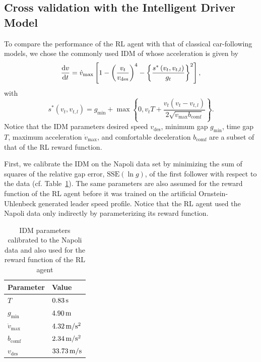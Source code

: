 \documentclass[review]{elsarticle}
\providecommand{\sub}[1]{_{\mathrm{#1}}}  %
\providecommand{\3}{{\ss}}
\begin{document}
	
	\subsection{Cross validation with the Intelligent Driver Model}
	\label{sec:crossValIDM}
	To compare the performance of the RL agent with that of
	classical car-following models, we chose the commonly used
	IDM of \cite{Opus} whose acceleration is given
	by 
	\begin{equation}
		\label{eq:IDM}
		\dv{v}{t}=\dot{v}\sub{max}\left[1-\left(\frac{v_t}{v\sub{des}}\right)^{4}-\left\{\frac{s^{*}\left(v_t, v_{t,l}\right)}{g_t}\right\}^{2}\right],
	\end{equation}
	with
	\begin{equation}
		\label{eq:IDMsstar}
		s^{*}\left(v_t, v_{t,l}\right)=g\sub{min}+\max \left\{0,v_tT+\frac{v_t(v_t-v_{t,l})}{2 \sqrt{\dot{v}\sub{max} b\sub{comf}}}\right\}.
	\end{equation}
	Notice that the IDM parameters desired
	speed $v\sub{des}$, minimum gap $g\sub{min}$, time gap $T$, maximum
	acceleration $\dot{v}\sub{max}$, and
	comfortable deceleration $b\sub{comf}$ are a subset of that of the RL reward
	function. 
	
	First, we calibrate the IDM on the Napoli data set by
	minimizing the sum of squares of the relative gap error,
	$\mathrm{SSE}(\ln g)$, of the first follower with respect to the
	data (cf. Table~\ref{tab:IDMparameters}). The same parameters are also
	assumed for the reward function of the RL agent before it was trained
	on the artificial Ornstein-Uhlenbeck generated leader speed profile. Notice that the RL agent used the Napoli data only
	indirectly by parameterizing its reward function.
	
	\begin{table}
		\caption{IDM parameters calibrated to the Napoli
			data and also used for the reward function of the RL agent}
		\label{tab:IDMparameters} 
		\begin{center}
			\begin{tabular}{ p{} |p{}  } 
				Parameter & Value   \\ \hline
				$T$ & $\unit[0.83]{s}$\\
				$g\sub{min}$ & $\unit[4.90]{m}$\\
				$\dot{v}\sub{max}$ & $\unit[4.32]{m/s^2}$\\
				$b\sub{comf}$ & $\unit[2.34]{ m/s^2}$\\
				$v\sub{des}$ & $\unit[33.73]{m/s}$			
			\end{tabular}
		\end{center}
	\end{table}
	
\end{document}
